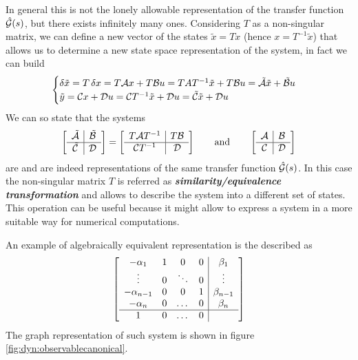 		In general this is not the lonely allowable representation of the transfer function $\hat {\mathcal{G}}(s)$, but there exists infinitely many ones. Considering $T$ as a non-singular matrix, we can define a new vector of the states $\tilde x = T x$ (hence $x = T^{-1} \tilde x$) that allows us to determine a new state space representation of the system, in fact we can build
		\begin{equation*}
		\begin{cases}
			\delta \tilde x = T \, \delta x  = T \mathcal{A} x + T \mathcal{B} u = T A T^{-1} \tilde x + T\mathcal{B} u = \tilde {\mathcal{A}} \tilde x + \tilde {\mathcal{B}} u \\
			\tilde y = \mathcal{C} x + \mathcal{D} u = \mathcal{C} T^{-1}\tilde x + \mathcal{D} u = \tilde {\mathcal{C}} \tilde x + \mathcal{D} u
		\end{cases}
		\end{equation*}
		We can so state that the systems
		\begin{equation} \label{eq:dyn:algebraicequivalence}
			\begin{bmatrix} \begin{array}{c|c}
					\tilde {\mathcal{A}} & \tilde {\mathcal{B}} \\ \hline \tilde {\mathcal{C}} & \mathcal{D}
			\end{array} \end{bmatrix} = \begin{bmatrix} \begin{array}{c|c}
				T\mathcal{A} T^{-1} & T \mathcal{B} \\ \hline \mathcal{C} T^{-1} & \mathcal{D}
			\end{array} \end{bmatrix} \qquad \textrm{and} \qquad \begin{bmatrix} \begin{array}{c|c}
				\mathcal{A} & \mathcal{B} \\ \hline \mathcal{C} & \mathcal{D}
			\end{array} \end{bmatrix}
		\end{equation}
		are  and are indeed representations of the same transfer function $\hat {\mathcal{G}}(s)$. In this case the non-singular matrix $T$ is referred as \textbf{\textit{similarity/equivalence transformation}} and allows to describe the system into a different set of states. This operation can be useful because it might allow to express a system in a more suitable way for numerical computations.
		
		An example of algebraically equivalent representation is the  described as
		\begin{equation}
		\begin{bmatrix} \begin{array}{ c c c c | c}
			-\alpha_1 & 1 & 0 & 0 & \beta_1 \\
			\vdots & 0 & \ddots & 0 & \vdots  \\
			-\alpha_{n-1} & 0 & 0 & 1 & \beta_{n-1} \\
			-\alpha_n & 0 & \dots & 0 & \beta_n \\ \hline
			1 & 0 & \dots & 0 
		\end{array} \end{bmatrix}
		\end{equation}
		The graph representation of such system is shown in figure \ref{fig:dyn:observablecanonical}.
	
